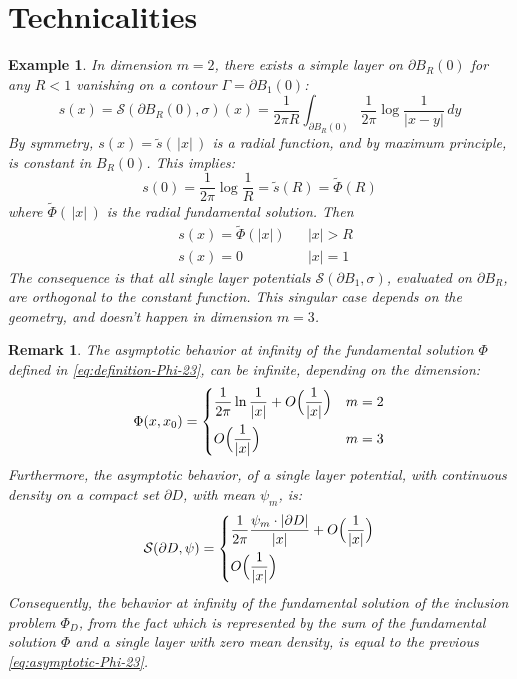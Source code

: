 \documentclass[10pt, a4paper, twoside, openright]{book}
\theoremstyle{definition}
\theoremstyle{plain}
\theoremstyle{plain}
\theoremstyle{plain}
\theoremstyle{plain}
\newtheorem{remark}[subsection]{Remark}
\theoremstyle{plain}
\theoremstyle{plain}
\newtheorem{example}[subsection]{Example}
\theoremstyle{plain}
\theoremstyle{plain}
\begin{document}
\section{Technicalities}
\begin{example}
 \label{example:van-s-lay}
 In dimension $m=2$, there exists a simple layer on $\partial B_R(0)$ for any $R<1$ vanishing on a contour $\Gamma = \partial B_1(0)$:
 \begin{equation}
 s(x) = \mathcal{S}(\partial B_R(0), \sigma)(x) = \frac{1}{2\pi R}\int_{\partial B_R(0)}\frac{1}{2\pi}\log\frac{1}{|x-y|}\,dy
 \end{equation}
 By symmetry, $s(x)=\tilde{s}(\,|x|\,)$ is a radial function, and by maximum principle, is constant in $B_R(0)$. This implies:
 \begin{equation}
  s(0) = \frac{1}{2\pi}\log\frac{1}{R}=\tilde{s}(R)=\tilde{\Phi}(R)
 \end{equation}
 where $\tilde{\Phi}(\,|x|\,)$ is the radial fundamental solution. Then
 \begin{align}
 & s(x) = \tilde{\Phi}(|x|) && |x| > R \\
 & s(x) = 0         && |x| = 1
 \end{align}
 The consequence is that all single layer potentials $\mathcal{S}(\partial B_1, \sigma)$, evaluated on $\partial B_R$, are orthogonal to the constant function. This singular case depends on the geometry, and doesn't happen in dimension $m=3$.
\end{example}
\begin{remark}
 The asymptotic behavior at infinity of the fundamental solution $\Phi$ defined in \eqref{eq:definition-Phi-23}, can be infinite, depending on the dimension:
 \begin{equation}
 \label{eq:asymptotic-Phi-23}
  \Phi(x,x_0)=
  \left\{
  \begin{aligned}
   &\dfrac{1}{2\pi}\ln\dfrac{1}{|x|} + O\Bigl(\dfrac{1}{|x|}\Bigr) && m=2 \\
   &O\Bigl(\dfrac{1}{|x|}\Bigr) && m=3
  \end{aligned}
  \right.
\end{equation}
 Furthermore, the asymptotic behavior, of a single layer potential, with continuous density on a compact set $\partial D$, with mean $\psi_m$, is:
  \begin{equation}
 \label{eq:asymptotic-single}
  \mathcal{S}(\partial D,\psi)=
  \left\{
  \begin{aligned}
   &\dfrac{1}{2\pi}\dfrac{\psi_m\cdot|\partial D|}{|x|} + O\Bigl(\dfrac{1}{|x|}\Bigr) \\%
   &O\Bigl(\dfrac{1}{|x|}\Bigr) %
  \end{aligned}
  \right.
\end{equation}
Consequently, the behavior at infinity of the fundamental solution of the inclusion problem $\Phi_D$, from the fact which is represented by the sum of the fundamental solution $\Phi$ and a single layer with zero mean density, is equal to the previous \eqref{eq:asymptotic-Phi-23}. 
\end{remark}
\end{document}
